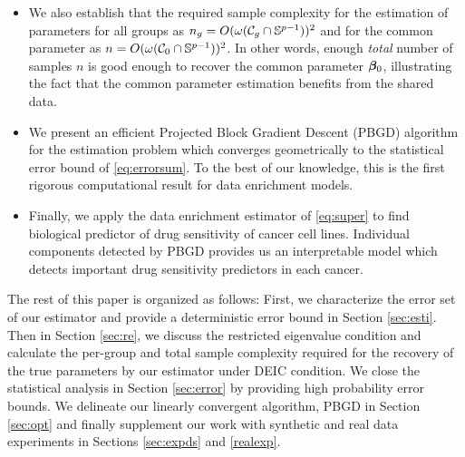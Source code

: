 \begin{itemize}[leftmargin = .4cm]
	\item We also establish that the required sample complexity for the estimation of parameters for all groups as $n_g = O(\omega({\cal C}_g \cap \mathbb S^{p-1}))^2$ and for the common parameter as $n = O(\omega({\cal C}_0 \cap \mathbb S^{p-1}))^2$. In other words, enough \emph{total} number of samples $n$ is good enough to recover the common parameter $\boldsymbol{\beta}_0$,
illustrating the fact that the common parameter estimation benefits from the shared data.
	\item We present an efficient Projected Block Gradient Descent (PBGD) algorithm for the estimation problem which converges geometrically to the statistical error bound of \eqref{eq:errorsum}. To the best of our knowledge, this is the first rigorous computational result for data enrichment models.
	\item Finally, we apply the data enrichment estimator of \eqref{eq:super} to find biological predictor of drug sensitivity of cancer cell lines. Individual components detected by PBGD provides us an interpretable model which detects important drug sensitivity predictors in each cancer.
\end{itemize}

The rest of this paper is organized as follows:
First, we characterize the error set of our estimator and provide a deterministic error bound in Section \ref{sec:esti}.
Then in Section \ref{sec:re}, we discuss the restricted eigenvalue condition and calculate the per-group and total sample complexity required for the recovery of the true parameters by our estimator under DEIC condition.
We close the statistical analysis in Section \ref{sec:error} by providing high probability error bounds.
We delineate our linearly convergent algorithm, PBGD in Section \ref{sec:opt} and finally supplement our work with synthetic and real data experiments in Sections \ref{sec:expds} and \ref{realexp}.

